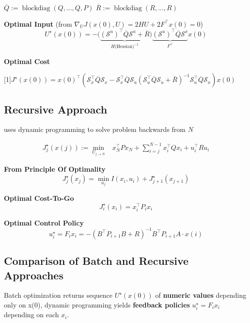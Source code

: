$\overline{Q} := \mathop{\mathrm{blockdiag}}(Q,\dots, Q,P)$
\quad
$\overline{R} := \mathop{\mathrm{blockdiag}}(R,\dots, R)$

\textbf{Optimal Input}
(from $\nabla_UJ(x(0),U)=2HU+2F^\top x(0)=0$)
\[ U^\star(x(0)) =
	- \bigl(
	\underbrace{
			(\mathcal{S}^u)^\top \overline{Q} \mathcal{S}^u + \overline{R}
		}_{H\text{(Hessian)}^{-1}}
	\bigr)
	\underbrace{
		(\mathcal{S}^u)^\top \overline{Q}\mathcal{S}^x
	}_ {F^\top}
	x(0)
\]


\textbf{Optimal Cost}

\scalebox{0.97}[1]{$
		\scriptstyle
		J^\star(x(0)) = x(0)^\top (
		\mathcal{S}_x^\top \overline{Q} \mathcal{S}_x
		- \mathcal{S}_x^\top \overline{Q} \mathcal{S}_u
		(\mathcal{S}_u^\top \overline{Q} \mathcal{S}_u
		+ \overline{R})^{-1}
		\mathcal{S}_u^\top \overline{Q} \mathcal{S}_x
		)x(0)$}


\subsection{Recursive Approach}

uses dynamic programming to solve problem backwards from $N$

\[\begin{aligned}
		J_j^\star(x(j)) :=
		\min_{U_{j\to N}} & x_N^\top P x_N \!+
		\sum_{i=j}^{N-1}x_i^\top Q x_i + u_i^\top R u_i
	\end{aligned}\]


\begin{minipage}[t]{0.64\linewidth}
	\textbf{From Principle Of Optimality}
	\[
		J_j^\star(x_j) =
		\min_{u_j} I(x_i,u_i) + J_{j+1}^\star(x_{j+1})
	\]
\end{minipage}
\begin{minipage}[t]{0.32\linewidth}
	\textbf{Optimal Cost-To-Go}
	\[
		J_i^\star(x_i) = x_i^\top P_i x_i
	\]
\end{minipage}

\textbf{Optimal Control Policy}
\[
	u_i^\star = F_i x_i =
	-(B^\top P_{i+1}B + R)^{-1}
	B^\top P_{i+1} A \cdot x(i)
\]

\subsection{Comparison of Batch and Recursive Approaches}

Batch optimization returns sequence $U^\star(x(0))$
of \textbf{numeric values} depending only on x(0),
dynamic programming yields \textbf{feedback policies}
$u_i^\star = F_i x_i$ depending on each $x_i$.

